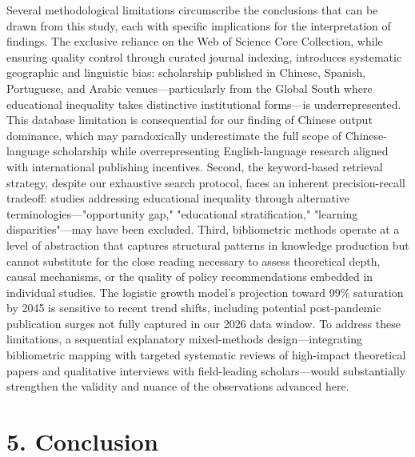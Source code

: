 \documentclass[12pt,a4paper]{article}
\begin{document}
Several methodological limitations circumscribe the conclusions that can be drawn from this study, each with specific implications for the interpretation of findings. The exclusive reliance on the Web of Science Core Collection, while ensuring quality control through curated journal indexing, introduces systematic geographic and linguistic bias: scholarship published in Chinese, Spanish, Portuguese, and Arabic venues—particularly from the Global South where educational inequality takes distinctive institutional forms—is underrepresented. This database limitation is consequential for our finding of Chinese output dominance, which may paradoxically underestimate the full scope of Chinese-language scholarship while overrepresenting English-language research aligned with international publishing incentives. Second, the keyword-based retrieval strategy, despite our exhaustive search protocol, faces an inherent precision-recall tradeoff: studies addressing educational inequality through alternative terminologies—"opportunity gap," "educational stratification," "learning disparities"—may have been excluded. Third, bibliometric methods operate at a level of abstraction that captures structural patterns in knowledge production but cannot substitute for the close reading necessary to assess theoretical depth, causal mechanisms, or the quality of policy recommendations embedded in individual studies. The logistic growth model's projection toward 99\% saturation by 2045 is sensitive to recent trend shifts, including potential post-pandemic publication surges not fully captured in our 2026 data window. To address these limitations, a sequential explanatory mixed-methods design—integrating bibliometric mapping with targeted systematic reviews of high-impact theoretical papers and qualitative interviews with field-leading scholars—would substantially strengthen the validity and nuance of the observations advanced here.

\section{5. Conclusion}
\end{document}
